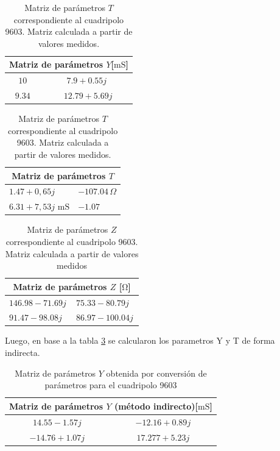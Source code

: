 	\begin{table}[H]
\centering
\begin{minipage}{0.48\textwidth}
\centering
\begin{tabular}{|c|c|}
\hline
\multicolumn{2}{|c|}{\textbf{Matriz de parámetros $Y$[$\mathrm{mS}$]}} \\ \hline
$10      \,$ & $7.9 + 0.55j\,$ \\ \hline
$9.34      \,$ & $  $  $12.79 + 5.69j\,$ \\ \hline
\end{tabular}
\caption{Matriz de parámetros $Y$ correspondiente al cuadripolo 9603. Matriz calculada a partir de valores medidos.}
\label{tab:matriz_Y9603}
\end{minipage}
\hfill
\begin{minipage}{0.48\textwidth}
\centering
\begin{tabular}{|l|l|}
\hline
\multicolumn{2}{|c|}{\textbf{Matriz de parámetros $T$}} \\ \hline
$1.47 + 0,65j$ & $-107.04\,\Omega$ \\ \hline
$6.31 + 7,53j$ $ \mathrm{mS} $ & $-1.07$ \\ \hline
\end{tabular}
\caption{Matriz de parámetros $T$ correspondiente al cuadripolo 9603. Matriz calculada a partir de valores medidos.}
\label{tab:matriz_T9603}
\end{minipage}
\end{table}

\begin{table}[H]
\centering
\begin{tabular}{|l|l|}
\hline
\multicolumn{2}{|c|}{\textbf{Matriz de parámetros $Z$ [$\mathrm{\Omega}$]}} \\ \hline
$146.98 - 71.69j\,$ & $75.33 - 80.79j\,$ \\ \hline
$91.47 - 98.08j\,$ & $86.97 - 100.04j\,$ \\ \hline
\end{tabular}
\caption{Matriz de parámetros $Z$ correspondiente al cuadripolo 9603. Matriz calculada a partir de valores medidos}
\label{tab:matriz_Z9603}
\end{table}

Luego, en base a la tabla \ref{tab:matriz_Z9603} se calcularon los parametros Y y T de forma indirecta.

\begin{table}[H]
\centering
\begin{tabular}{|c|c|}
\hline
\multicolumn{2}{|c|}{\textbf{Matriz de parámetros $Y$ (método indirecto)[$\mathrm{mS}$]}} \\ \hline
$14.55 - 1.57j\,$ & $-12.16 + 0.89j\,$ \\ \hline
$-14.76 + 1.07j\,$ & $17.277 + 5.23j\,$ \\ \hline
\end{tabular}
\caption{Matriz de parámetros $Y$ obtenida por conversión de parámetros para el cuadripolo 9603}
\label{tab:matriz_Y9603_indirecta}
\end{table}

